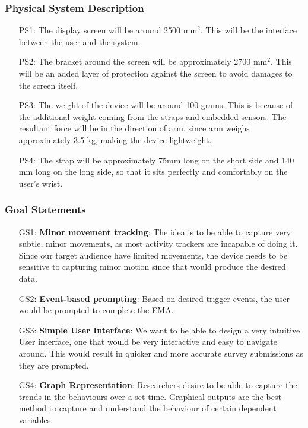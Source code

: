\documentclass[12pt]{article}
\begin{document}
\subsubsection{Physical System Description} \label{sec_phySystDescrip}



\begin{itemize}

  \label{PS1}\item[PS1:] The display screen will be around 2500 mm$^2$. This will be the interface between the user and the system.
  \label{PS2}\item[PS2:] The bracket around the screen will be approximately 2700 mm$^2$. This will be an added layer of protection against the screen to avoid damages to the screen itself.
  \label{PS3}\item[PS3:] The weight of the device will be around 100 grams. This is because of the additional weight coming from the straps and embedded sensors. The resultant force will be in the direction of arm, since arm weighs approximately 3.5 kg, making the device lightweight.
  \label{PS4}\item[PS4:] The strap will be approximately 75mm long on the short side and 140 mm long on the long side, so that it sits perfectly and comfortably on the user's wrist.

\end{itemize}


\subsubsection{Goal Statements}
\begin{itemize}

  \label{GS1} \item[GS1:] \textbf{Minor movement tracking}: The idea is to be able to capture very subtle, minor movements, as most activity trackers are incapable of doing it. Since our target audience have limited movements, the device needs to be sensitive to capturing minor motion since that would produce the desired data.
   \label{GS2}\item[GS2:] \textbf{Event-based prompting}: Based on desired trigger events, the user would be prompted to complete the EMA.
   \label{GS3}\item[GS3:] \textbf{Simple User Interface}: We want to be able to design a very intuitive User interface, one that would be very interactive and easy to navigate around. This would result in quicker and more accurate survey submissions as they are prompted.
   \label{GS4}\item[GS4:] \textbf{Graph Representation}: Researchers desire to be able to capture the trends in the behaviours over a set time. Graphical outputs are the best method to capture and understand the behaviour of certain dependent variables.

\end{itemize}
\end{document}

